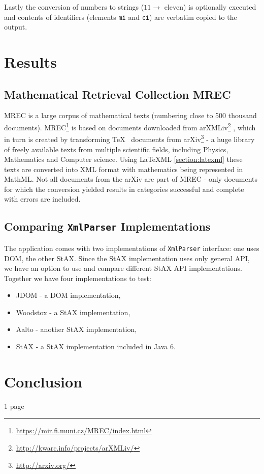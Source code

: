 \documentclass[11pt,oneside,final]{fithesis2}
\begin{document}
Lastly the conversion of numbers to strings ($11 \rightarrow$ eleven) is optionally executed and contents of identifiers (elements \texttt{mi} and \texttt{ci}) are verbatim copied to the output. 



\chapter{Results}
\section{Mathematical Retrieval Collection MREC}
\label{section:mrec}
MREC \cite{mrec:mrec2011} is a large corpus of mathematical texts (numbering close to 500 thousand documents). MREC\footnote{\url{https://mir.fi.muni.cz/MREC/index.html}} is based on documents downloaded from arXMLiv\footnote{\url{http://kwarc.info/projects/arXMLiv/}} \cite{mrec:arXMLiv2010}, which in turn is created by transforming \TeX~ documents from arXiv\footnote{\url{http://arxiv.org/}} - a huge library of freely available texts from multiple scientific fields, including Physics, Mathematics and Computer science. Using \LaTeX ML \ref{section:latexml} these texts are converted into XML format with mathematics being represented in MathML. Not all documents from the arXiv are part of MREC - only documents for which the conversion yielded results in categories successful and complete with errors are included.


\section{Comparing \texttt{XmlParser} Implementations}
\label{section:compareparsers}
The application comes with two implementations of \texttt{XmlParser} interface: one uses DOM, the other StAX. Since the StAX implementation uses only general API, we have an option to use and compare different StAX API implementations. Together we have four implementations to test:
\begin{itemize}
\item JDOM - a DOM implementation,
\item Woodstox - a StAX implementation,
\item Aalto - another StAX implementation,
\item StAX - a StAX implementation included in Java 6.
\end{itemize} 



\chapter{Conclusion}
1 page

\clearpage
{}


\end{document}
